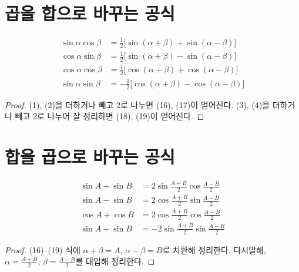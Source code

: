 \documentclass{article}
\renewcommand\a{\ensuremath{\alpha}}
\renewcommand\b{\ensuremath{\beta}}
\begin{document}
\section{곱을 합으로 바꾸는 공식}
\begin{align}
\sin\a\cos\b&=\frac12\big[\sin(\a+\b)+\sin(\a-\b)\big]\\
\cos\a\sin\b&=\frac12\big[\sin(\a+\b)-\sin(\a-\b)\big]\\
\cos\a\cos\b&=\frac12\big[\cos(\a+\b)+\cos(\a-\b)\big]\\
\sin\a\sin\b&=-\frac12\big[\cos(\a+\b)-\cos(\a-\b)\big]
\end{align}
\begin{proof}
(1), (2)을 더하거나 빼고 2로 나누면 (16), (17)이 얻어진다.
(3), (4)을 더하거나 빼고 2로 나누어 잘 정리하면 (18), (19)이 얻어진다.
\end{proof}

\section{합을 곱으로 바꾸는 공식}
\begin{align}
\sin A+\sin B&=2\sin\frac{A+B}2\cos\frac{A-B}2\\
\sin A-\sin B&=2\cos\frac{A+B}2\sin\frac{A-B}2\\
\cos A+\cos B&=2\cos\frac{A+B}2\cos\frac{A-B}2\\
\sin A+\sin B&=-2\sin\frac{A+B}2\sin\frac{A-B}2
\end{align}
\begin{proof}
(16)--(19) 식에 \(\a+\b=A\), \(\a-\b=B\)로 치환해 정리한다.
다시말해, \(\a=\frac{A+B}2\), \(\b=\frac{A-B}2\)를 대입해 정리한다.
\end{proof}
\end{document}
